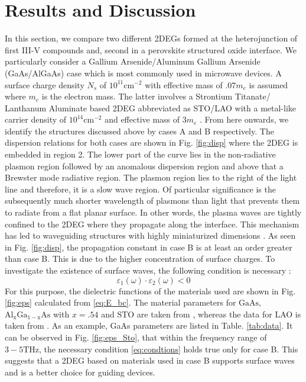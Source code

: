 \documentclass[conference, 10pt]{IEEEtran}
\renewcommand{\O}{\omega}  %
\newcommand{\E}{\varepsilon}  %
\renewcommand{\^}{\hat}  %
\begin{document}
\section{Results and Discussion}
%
In this section, we compare two different 2DEGs formed at the heterojunction of first III-V compounds and, second in a perovskite structured oxide interface. We particularly consider a Gallium Arsenide/Aluminum Gallium Arsenide (GaAs/AlGaAs) case which is most commonly used in microwave devices. A surface charge density $N_s$ of $10^{11} \mathrm{cm}^{-2}$ with effective mass of $.07 m_e$ is assumed where $m_e$ is the electron mass. The latter involves a Strontium Titanate/ Lanthanum Aluminate based 2DEG abbreviated as STO/LAO with a metal-like carrier density of $10^{14} \mathrm{cm}^{-2}$ and effective mass of $3 m_e$ \cite{mannhart2010oxide}. From here onwards, we identify the structures discussed above by cases A and B respectively. The dispersion relations for both cases are shown in Fig. \ref{fig:disp} where the 2DEG is embedded in region 2. The lower part of the curve lies in the non-radiative plasmon region followed by an anomalous dispersion region and above that a Brewster mode radiative region. The plasmon region lies to the right of the light line and therefore, it is a slow wave region. Of particular significance is the subsequently much shorter wavelength of plasmons than light that prevents them to radiate from a flat planar surface. In other words, the plasma waves are tightly confined to the 2DEG where they propagate along the interface. This mechanism has led to waveguiding structures with highly miniaturized dimensions \cite{andress2012ultra}. As seen in Fig. \ref{fig:disp}, the propagation constant in case B is at least an order greater than case B. This is due to the higher concentration of surface charges. To investigate the existence of surface waves, the following condition is necessary \cite{nevels2016optical}:
%
\begin{equation}
  \E_1(\O) \cdot \E_2(\O) < 0
  \label{eq:condtions}
\end{equation}
%
%
For this purpose, the dielectric functions of the materials used are shown in Fig. \ref{fig:eps} calculated from \eqref{eq:E_bc}. The material parameters for $\mathrm{GaAs}$, $\mathrm{Al_xGa_{1-x}As}$ with $x=.54$ and $\mathrm{STO}$ are taken from \cite{Palik1997429}, whereas the data for LAO is taken from \cite{zhang1994infrared}. As an example, GaAs parameters are listed in Table. \ref{tab:data}. It can be observed in Fig. \ref{fig:eps_Sto}, that within the frequency range of $3-5 \mathrm{THz}$, the necessary condition \eqref{eq:condtions} holds true only for case B. This suggests that a 2DEG based on materials used in case B supports surface waves and is a better choice for guiding devices.
\end{document}
